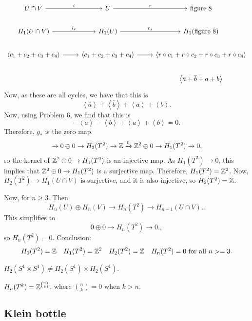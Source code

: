     \[
        \begin{tikzcd}
            U \cap V \arrow[r, "i"] & U \arrow[r, "r"] & \text{figure 8}\\
            H_1(U \cap V) \arrow[r, "i_r"] & H_1(U) \arrow[r, "r_*"] & H_1(\text{figure 8})\\
            \left<c_1 + c_2 + c_3 + c_4 \right> \arrow[r, ""] & \left<c_1+ c_2 +c_3 +c_4 \right> \arrow[r, ""] & \left<r  \circ  c_1 + r  \circ  c_2 + r  \circ  c_3 + r  \circ  c_4 \right>\\
                                  && \left< \overline{a} + \overline{b} + a + b \right>
        \end{tikzcd}
    \]
    Now, as these are all cycles, we have that this is 
    \[
    \left<\overline{a} \right> + \left<\overline{b} \right> + \left<a \right> + \left<b \right>
    .\] 
    Now, using Problem 6, we find that this is
    \[
    - \left<a \right> - \left<b \right> + \left<a \right> + \left<b \right> = 0
    .\] 
    Therefore, $g_*$ is the zero map.
    \[
        \to  0 \oplus 0 \to  H_2(T^2) \to  \mathbb{Z} \xrightarrow{0}   \mathbb{Z}^2 \oplus 0 \to  H_1(T^2) \to  0
    ,\] 
    so the kernel of $\mathbb{Z}^2 \oplus 0 \to  H_1(T^2)$ is an injective map.
    As $H_1(T^2) \to  0$, this implies that $\mathbb{Z}^2 \oplus 0 \to  H_1(T^2)$ is a surjective map.
    Therefore, $H_1(T^2) = \mathbb{Z}^2$.
    Now, $H_2(T^2) \to H_1(U \cap V)$ is surjective, and it is also injective, so $H_2(T^2) = \mathbb{Z}$.
    


Now, for $n \ge  3$.
Then
\[
    H_n(U) \oplus H_n(V) \to  H_n(T^2) \to  H_{n-1}(U \cap V).
.\] 
This simplifies  to
\[
    0 \oplus 0 \to  H_n(T^2) \to 0.
,\] 
so $H_n(T^2) = 0$.
Conclusion:
\[
    H_0(T^2) = \mathbb{Z} \quad 
    H_1(T^2) = \mathbb{Z}^2 \quad 
    H_2(T^2) = \mathbb{Z} \quad 
    H_n(T^2) = 0 \text{ for all $ n > =3$}
.\] 
\begin{remark}
    $H_2(S^1 \times S^1) \neq H_2(S^{1}) \times H_2(S^{1})$.
\end{remark}


\begin{remark}
    $H_n(T^{k}) = \mathbb{Z}^{n \choose k}$, where ${n \choose k} = 0$ when  $k > n$.
\end{remark}




\subsection*{Klein bottle}

